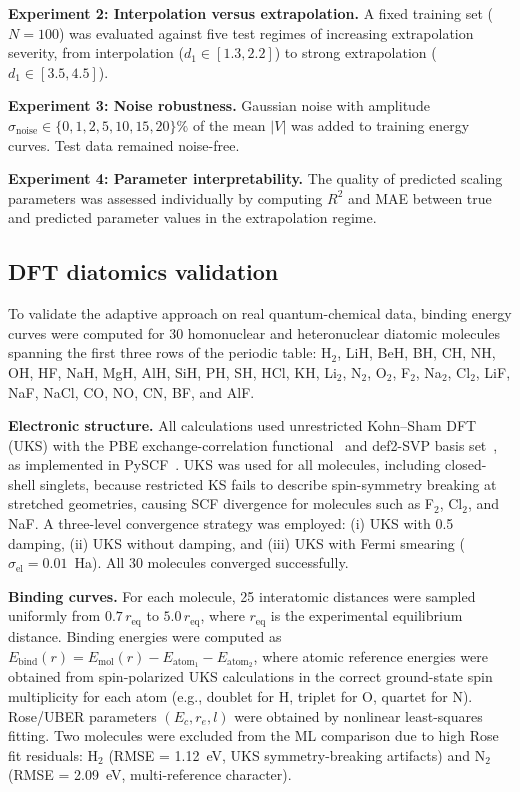 \documentclass[aps,prb,twocolumn,superscriptaddress,longbibliography,floatfix]{revtex4-2}
\begin{document}
\textbf{Experiment 2: Interpolation versus extrapolation.} A fixed training set ($N = 100$) was evaluated against five test regimes of increasing extrapolation severity, from interpolation ($d_1 \in [1.3, 2.2]$) to strong extrapolation ($d_1 \in [3.5, 4.5]$).

\textbf{Experiment 3: Noise robustness.} Gaussian noise with amplitude $\sigma_\mathrm{noise} \in \{0, 1, 2, 5, 10, 15, 20\}\%$ of the mean $|V|$ was added to training energy curves. Test data remained noise-free.

\textbf{Experiment 4: Parameter interpretability.} The quality of predicted scaling parameters was assessed individually by computing $R^2$ and MAE between true and predicted parameter values in the extrapolation regime.

\subsection{DFT diatomics validation}
\label{sec:dft_methods}

To validate the adaptive approach on real quantum-chemical data, binding energy curves were computed for 30 homonuclear and heteronuclear diatomic molecules spanning the first three rows of the periodic table: H$_2$, LiH, BeH, BH, CH, NH, OH, HF, NaH, MgH, AlH, SiH, PH, SH, HCl, KH, Li$_2$, N$_2$, O$_2$, F$_2$, Na$_2$, Cl$_2$, LiF, NaF, NaCl, CO, NO, CN, BF, and AlF.

\textbf{Electronic structure.} All calculations used unrestricted Kohn--Sham DFT (UKS) with the PBE exchange-correlation functional~\cite{Perdew1996} and def2-SVP basis set~\cite{Weigend2005}, as implemented in PySCF~\cite{Sun2018}. UKS was used for all molecules, including closed-shell singlets, because restricted KS fails to describe spin-symmetry breaking at stretched geometries, causing SCF divergence for molecules such as F$_2$, Cl$_2$, and NaF. A three-level convergence strategy was employed: (i) UKS with 0.5 damping, (ii) UKS without damping, and (iii) UKS with Fermi smearing ($\sigma_\mathrm{el} = 0.01$~Ha). All 30 molecules converged successfully.

\textbf{Binding curves.} For each molecule, 25 interatomic distances were sampled uniformly from $0.7\, r_\mathrm{eq}$ to $5.0\, r_\mathrm{eq}$, where $r_\mathrm{eq}$ is the experimental equilibrium distance. Binding energies were computed as $E_\mathrm{bind}(r) = E_\mathrm{mol}(r) - E_{\mathrm{atom}_1} - E_{\mathrm{atom}_2}$, where atomic reference energies were obtained from spin-polarized UKS calculations in the correct ground-state spin multiplicity for each atom (e.g., doublet for H, triplet for O, quartet for N). Rose/UBER parameters $(E_c, r_e, l)$ were obtained by nonlinear least-squares fitting. Two molecules were excluded from the ML comparison due to high Rose fit residuals: H$_2$ (RMSE = 1.12~eV, UKS symmetry-breaking artifacts) and N$_2$ (RMSE = 2.09~eV, multi-reference character).
\end{document}
